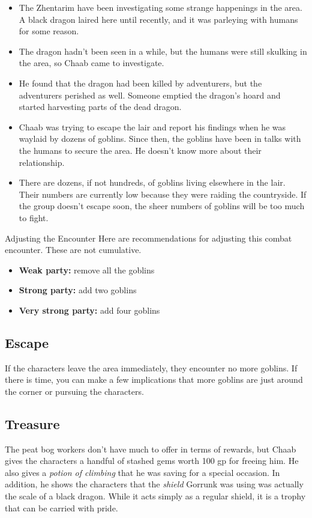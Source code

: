 \documentclass[10pt,a4paper,twoside,bg=print,twocolumn,openany,nodeprecatedcode]{dndbook}
\begin{document}
\begin{itemize}
\item The Zhentarim have been investigating some strange happenings in the area. A black dragon laired here until recently, and it was parleying with humans for some reason.
\item The dragon hadn't been seen in a while, but the humans were still skulking in the area, so Chaab came to investigate.
\item He found that the dragon had been killed by adventurers, but the adventurers perished as well. Someone emptied the dragon's hoard and started harvesting parts of the dead dragon.
\item Chaab was trying to escape the lair and report his findings when he was waylaid by dozens of goblins. Since then, the goblins have been in talks with the humans to secure the area. He doesn't know more about their relationship.
\item There are dozens, if not hundreds, of goblins living elsewhere in the lair. Their numbers are currently low because they were raiding the countryside. If the group doesn't escape soon, the sheer numbers of goblins will be too much to fight.
\end{itemize}

\begin{DndSidebar}[float=!b]{Adjusting the Encounter}
Here are recommendations for adjusting this combat encounter. These are not cumulative.




\begin{itemize}
\item \textbf{Weak party:} remove all the goblins
\item \textbf{Strong party:} add two goblins
\item \textbf{Very strong party:} add four goblins
\end{itemize}



\end{DndSidebar}

\subsection{Escape}
If the characters leave the area immediately, they encounter no more goblins. If there is time, you can make a few implications that more goblins are just around the corner or pursuing the characters.

\subsection{Treasure}
The peat bog workers don't have much to offer in terms of rewards, but Chaab gives the characters a handful of stashed gems worth 100 gp for freeing him. He also gives a \textit{potion of climbing} that he was saving for a special occasion. In addition, he shows the characters that the \textit{shield} Gorrunk was using was actually the scale of a black dragon. While it acts simply as a regular shield, it is a trophy that can be carried with pride.
\end{document}
